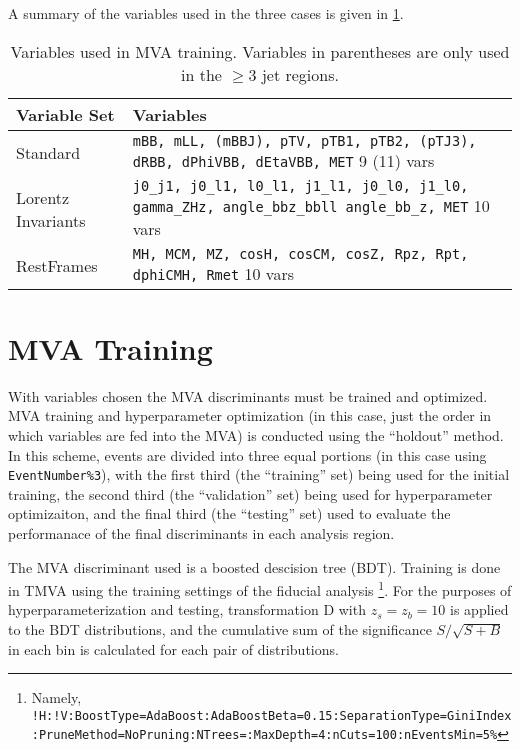 A summary of the variables used in the three cases is given in \ref{tab:variables}.

\begin{table}[!htbp]
  \begin{center}\begin{tabular}{l|p{4.5in}}
      \hline\hline
      Variable Set & Variables\\
      \hline
      Standard & \texttt{mBB,\- mLL, (mBBJ),\- pTV,\- pTB1,\- pTB2,\- (pTJ3),\- dRBB,\- dPhiVBB,\- dEtaVBB,\- MET} 9 (11) vars\\
      Lorentz Invariants &  \texttt{j0\_j1,\- j0\_l1,\- l0\_l1,\- j1\_l1,\- j0\_l0,\- j1\_l0,\- gamma\_ZHz,\- angle\_bbz\_bbll\- angle\_bb\_z,\- MET} 10 vars\\
      RestFrames & \texttt{MH,\- MCM,\- MZ,\- cosH,\- cosCM,\- cosZ,\- Rpz,\- Rpt,\- dphiCMH,\- Rmet} 10 vars\\
      \hline\hline
    \end{tabular}
    \caption{Variables used in MVA training.  Variables in parentheses are only used in the $\ge 3$ jet regions.}
  \end{center}
  \label{tab:variables}
\end{table}



\section{MVA Training}
With variables chosen the MVA discriminants must be trained and optimized.  MVA training and hyperparameter optimization (in this case, just the order in which variables are fed into the MVA) is conducted using the ``holdout'' method.
  In this scheme, events are divided into three equal portions (in this case using \texttt{EventNumber\%3}), with the first third (the ``training'' set) being used for the initial training, the second third (the ``validation'' set) being used for hyperparameter optimizaiton, and the final third (the ``testing'' set) used to evaluate the performanace of the final discriminants in each analysis region.

The MVA discriminant used is a boosted descision tree (BDT).  Training is done in TMVA using the training settings of the fiducial analysis \cite{supportnote}\footnote{Namely, \texttt{!H:\-!V:\-BoostType=\-AdaBoost:\-AdaBoostBeta=0.15:\-SeparationType=\-GiniIndex:\-PruneMethod=\-NoPruning:\-NTrees=:\-MaxDepth=4:\-nCuts=100:\-nEventsMin=5\%}}.  For the purposes of hyperparameterization and testing, transformation D with $z_s=z_b=10$ is applied to the BDT distributions, and the cumulative sum of the significance $S/\sqrt{S+B}$ in each bin is calculated for each pair of distributions.  

